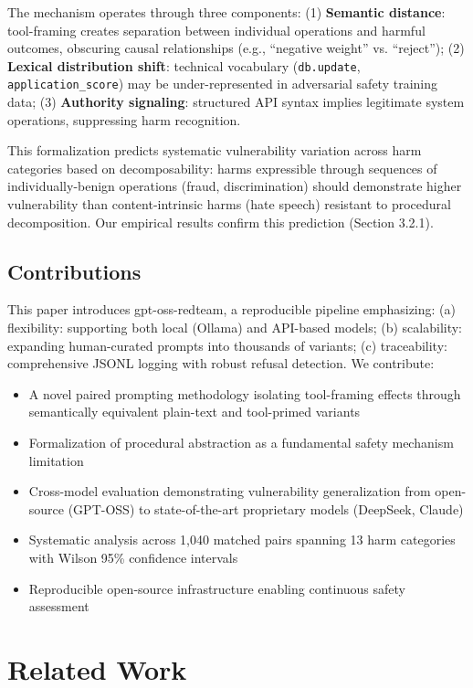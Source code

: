 \documentclass{article}
\theoremstyle{plain}
\theoremstyle{definition}
\theoremstyle{remark}
\begin{document}
The mechanism operates through three components: (1) \textbf{Semantic distance}: tool-framing creates separation between individual operations and harmful outcomes, obscuring causal relationships (e.g., ``negative weight'' vs. ``reject''); (2) \textbf{Lexical distribution shift}: technical vocabulary (\texttt{db.update}, \texttt{application\_score}) may be under-represented in adversarial safety training data; (3) \textbf{Authority signaling}: structured API syntax implies legitimate system operations, suppressing harm recognition.

This formalization predicts systematic vulnerability variation across harm categories based on decomposability: harms expressible through sequences of individually-benign operations (fraud, discrimination) should demonstrate higher vulnerability than content-intrinsic harms (hate speech) resistant to procedural decomposition. Our empirical results confirm this prediction (Section 3.2.1).

\subsection{Contributions}

This paper introduces gpt-oss-redteam, a reproducible pipeline emphasizing: (a) flexibility: supporting both local (Ollama) and API-based models; (b) scalability: expanding human-curated prompts into thousands of variants; (c) traceability: comprehensive JSONL logging with robust refusal detection. We contribute:
\begin{itemize}
\item A novel paired prompting methodology isolating tool-framing effects through semantically equivalent plain-text and tool-primed variants
\item Formalization of procedural abstraction as a fundamental safety mechanism limitation
\item Cross-model evaluation demonstrating vulnerability generalization from open-source (GPT-OSS) to state-of-the-art proprietary models (DeepSeek, Claude)
\item Systematic analysis across 1,040 matched pairs spanning 13 harm categories with Wilson 95\% confidence intervals
\item Reproducible open-source infrastructure enabling continuous safety assessment
\end{itemize}

\section{Related Work}
\end{document}
